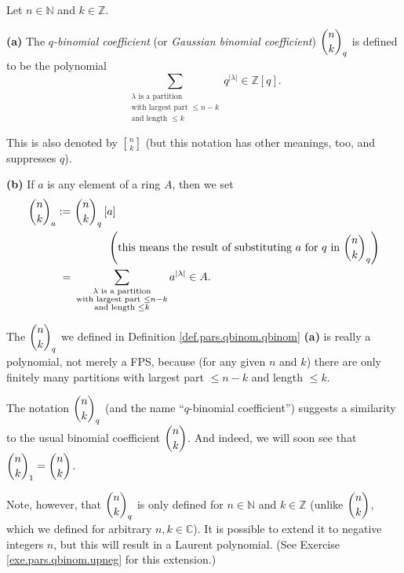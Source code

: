 \begin{definition}
\label{def.pars.qbinom.qbinom}Let $n\in\mathbb{N}$ and $k\in\mathbb{Z}$.
\medskip

\textbf{(a)} The $q$\emph{-binomial coefficient} (or \emph{Gaussian binomial
coefficient}) $\dbinom{n}{k}_{q}$ is defined to be the polynomial%
\[
\sum_{\substack{\lambda\text{ is a partition}\\\text{with largest part }\leq
n-k\\\text{and length }\leq k}}q^{\left\vert \lambda\right\vert }\in
\mathbb{Z}\left[  q\right]  .
\]


This is also denoted by $%
\genfrac{[}{]}{0pt}{0}{n}{k}%
$ (but this notation has other meanings, too, and suppresses $q$). \medskip

\textbf{(b)} If $a$ is any element of a ring $A$, then we set%
\begin{align*}
\dbinom{n}{k}_{a}:=  &  \ \dbinom{n}{k}_{q}\left[  a\right] \\
&  \ \ \ \ \ \ \ \ \ \ \left(  \text{this means the result of substituting
}a\text{ for }q\text{ in }\dbinom{n}{k}_{q}\right) \\
=  &  \ \sum_{\substack{\lambda\text{ is a partition}\\\text{with largest part
}\leq n-k\\\text{and length }\leq k}}a^{\left\vert \lambda\right\vert }\in A.
\end{align*}

\end{definition}

\begin{remark}
\label{rmk.pars.qbinom.poly}The $\dbinom{n}{k}_{q}$ we defined in Definition
\ref{def.pars.qbinom.qbinom} \textbf{(a)} is really a polynomial, not merely a
FPS, because (for any given $n$ and $k$) there are only finitely many
partitions with largest part $\leq n-k$ and length $\leq k$.
\end{remark}

\begin{remark}
\label{rmk.pars.qbinom.neg}The notation $\dbinom{n}{k}_{q}$ (and the name
\textquotedblleft$q$-binomial coefficient\textquotedblright) suggests a
similarity to the usual binomial coefficient $\dbinom{n}{k}$. And indeed, we
will soon see that $\dbinom{n}{k}_{1}=\dbinom{n}{k}$.

Note, however, that $\dbinom{n}{k}_{q}$ is only defined for $n\in\mathbb{N}$
and $k\in\mathbb{Z}$ (unlike $\dbinom{n}{k}$, which we defined for arbitrary
$n,k\in\mathbb{C}$). It is possible to extend it to negative integers $n$, but
this will result in a Laurent polynomial. (See Exercise
\ref{exe.pars.qbinom.upneg} for this extension.)
\end{remark}


